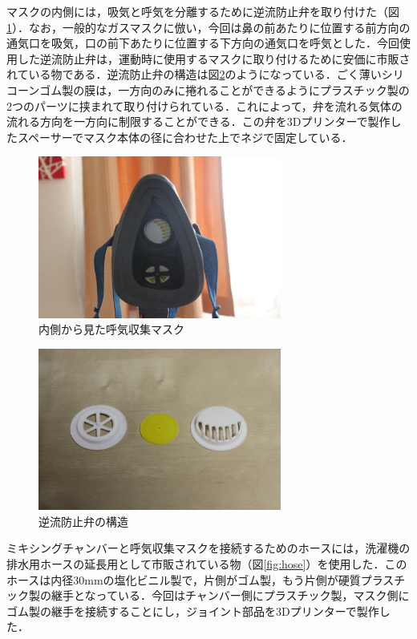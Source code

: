 マスクの内側には，吸気と呼気を分離するために逆流防止弁を取り付けた（図\ref{fig:mask_rear}）．なお，一般的なガスマスクに倣い，今回は鼻の前あたりに位置する前方向の通気口を吸気，口の前下あたりに位置する下方向の通気口を呼気とした．今回使用した逆流防止弁は，運動時に使用するマスクに取り付けるために安価に市販されている物である．逆流防止弁の構造は図\ref{fig:bulb}のようになっている．ごく薄いシリコーンゴム製の膜は，一方向のみに捲れることができるようにプラスチック製の2つのパーツに挟まれて取り付けられている．これによって，弁を流れる気体の流れる方向を一方向に制限することができる．この弁を3Dプリンターで製作したスペーサーでマスク本体の径に合わせた上でネジで固定している．

\begin{figure}[H]
  \begin{center}
    \includegraphics[width=8cm]{fig/mask_rear}
    \caption{内側から見た呼気収集マスク}
    \label{fig:mask_rear}
  \end{center}
\end{figure}

\begin{figure}[H]
  \begin{center}
    \includegraphics[width=8cm]{fig/bulb}
    \caption{逆流防止弁の構造}
    \label{fig:bulb}
  \end{center}
\end{figure}

ミキシングチャンバーと呼気収集マスクを接続するためのホースには，洗濯機の排水用ホースの延長用として市販されている物（図\ref{fig:hose}）を使用した．このホースは内径30mmの塩化ビニル製で，片側がゴム製，もう片側が硬質プラスチック製の継手となっている．今回はチャンバー側にプラスチック製，マスク側にゴム製の継手を接続することにし，ジョイント部品を3Dプリンターで製作した．

